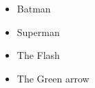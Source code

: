 \documentclass{article}
\begin{document}
	\begin{itemize}
		\item Batman
		\item Superman
		\item The Flash
		\item The Green arrow
	\end{itemize}
\end{document}
